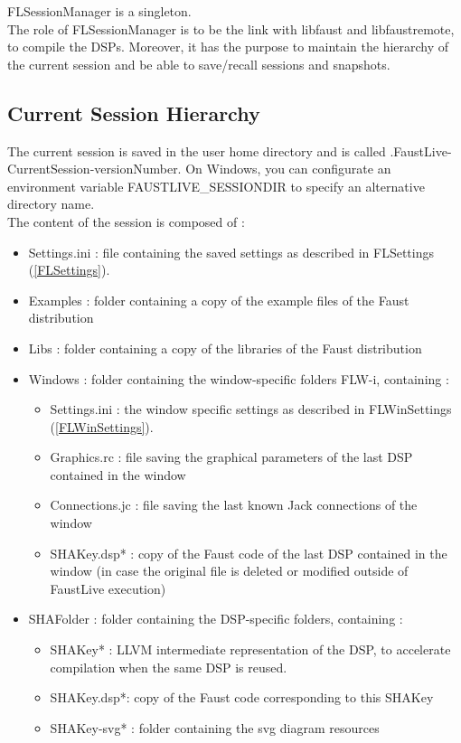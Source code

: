 \documentclass[a4paper]{article}
\begin{document}
FLSessionManager is a singleton.\\
The role of FLSessionManager is to be the link with libfaust and libfaustremote, to compile the DSPs. Moreover, it has the purpose to maintain the hierarchy of the current session and be able to save/recall sessions and snapshots. 

\subsection{Current Session Hierarchy}

The current session is saved in the user home directory and is called .FaustLive-CurrentSession-versionNumber. On Windows, you can configurate an environment variable FAUSTLIVE\_SESSIONDIR to specify an alternative directory name. \\
The content of the session  is composed of : 
\begin{itemize}
\item Settings.ini : file containing the saved settings as described in FLSettings (\ref{FLSettings}).
\item Examples : folder containing a copy of the example files of the Faust distribution
\item Libs : folder containing a copy of the libraries of the Faust distribution
\item Windows : folder containing the window-specific folders FLW-i, containing :
	\begin{itemize}
		\item Settings.ini : the window specific settings as described in FLWinSettings (\ref{FLWinSettings}).
		\item Graphics.rc : file saving the graphical parameters of the last DSP contained in the window
		\item Connections.jc : file saving the last known Jack connections of the window
		\item SHAKey.dsp* : copy of the Faust code of the last DSP contained in the window (in case the original file is deleted or modified outside of FaustLive execution)
	\end{itemize}
\item SHAFolder : folder containing the DSP-specific folders, containing : 
	\begin{itemize}
		\item SHAKey* : LLVM intermediate representation of the DSP, to accelerate compilation when the same DSP is reused.
		\item SHAKey.dsp*: copy of the Faust code corresponding to this SHAKey
		\item SHAKey-svg* : folder containing the svg diagram resources
	\end{itemize}
\end{itemize}
\end{document}
